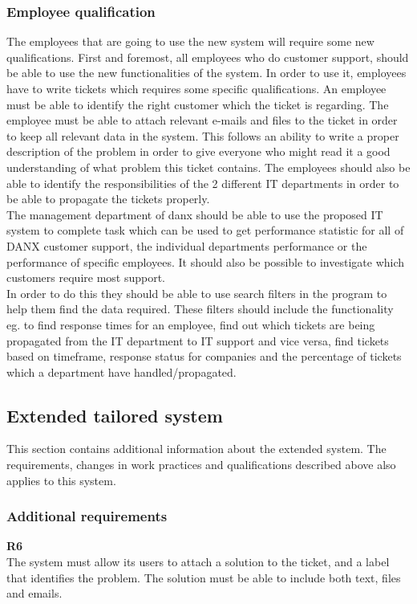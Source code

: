\subsubsection{Employee qualification}
\label{subsub:basicqual}
The employees that are going to use the new system will require some new qualifications. First and foremost, all employees who do customer support, should be able to use the new functionalities of the system. In order to use it, employees have to write tickets which requires some specific qualifications. An employee must be able to identify the right customer which the ticket is regarding. The employee must be able to attach relevant e-mails and files to the ticket in order to keep all relevant data in the system. This follows an ability to write a proper description of the problem in order to give everyone who might read it a good understanding of what problem this ticket contains. The employees should also be able to identify the responsibilities of the 2 different IT departments in order to be able to propagate the tickets properly.\\
The management department of danx should be able to use the proposed IT system to complete task which can be used to get performance statistic for all of DANX customer support, the individual departments performance or the performance of specific employees. It should also be possible to investigate which customers require most support.\\
In order to do this they should be able to use search filters in the program to help them find the data required. These filters should include the functionality eg. to find response times for an employee, find out which tickets are being propagated from the IT department to IT support and vice versa, find tickets based on timeframe, response status for companies and the percentage of tickets which a department have handled/propagated.

\subsection{Extended tailored system}
This section contains additional information about the extended system. The requirements, changes in work practices and qualifications described above also applies to this system.

\subsubsection{Additional requirements}
\textbf{R6} \\
The system must allow its users to attach a solution to the ticket, and a label that identifies the problem. The solution must be able to include both text, files and emails. \\

